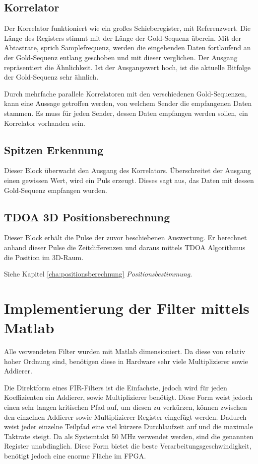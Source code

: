 \subsection{Korrelator}
Der Korrelator funktioniert wie ein großes Schieberegister, mit Referenzwert. Die Länge des Registers stimmt mit der Länge der Gold-Sequenz überein. Mit der Abtastrate, sprich Samplefrequenz, werden die eingehenden Daten fortlaufend an der Gold-Sequenz entlang geschoben und mit dieser verglichen. Der Ausgang repräsentiert die Ähnlichkeit. Ist der Ausgangswert hoch, ist die aktuelle Bitfolge der Gold-Sequenz sehr ähnlich. 

Durch mehrfache parallele Korrelatoren mit den verschiedenen Gold-Sequenzen, kann eine Aussage getroffen werden, von welchem Sender die empfangenen Daten stammen. Es muss für jeden Sender, dessen Daten empfangen werden sollen, ein Korrelator vorhanden sein.

\subsection{Spitzen Erkennung}
Dieser Block überwacht den Ausgang des Korrelators. Überschreitet der Ausgang einen gewissen Wert, wird ein Puls erzeugt. Dieses sagt aus, das Daten mit dessen Gold-Sequenz empfangen wurden.

\subsection{TDOA 3D Positionsberechnung}
Dieser Block erhält die Pulse der zuvor beschiebenen Auswertung. Er berechnet anhand dieser Pulse die Zeitdifferenzen und daraus mittels TDOA Algorithmus die Position im 3D-Raum.

Siehe Kapitel \ref{cha:positionsberechnung} \emph{Positionsbestimmung}.

\section{Implementierung der Filter mittels Matlab}
Alle verwendeten Filter wurden mit Matlab dimensioniert. Da diese von relativ hoher Ordnung sind, benötigen diese in Hardware sehr viele Multiplizierer sowie Addierer. 

Die Direktform eines FIR-Filters ist die Einfachste, jedoch wird für jeden Koeffizienten ein Addierer, sowie Multiplizierer benötigt. Diese Form weist jedoch einen sehr langen kritischen Pfad auf, um diesen zu verkürzen, können zwischen den einzelnen Addierer sowie Multiplizierer Register eingefügt werden.
Dadurch weist jeder einzelne Teilpfad eine viel kürzere Durchlaufzeit auf und die maximale Taktrate steigt. Da als Systemtakt 50 MHz verwendet werden, sind die genannten Register unabdinglich. Diese Form bietet die beste Verarbeitungsgeschwindigkeit, benötigt jedoch eine enorme Fläche im FPGA.

